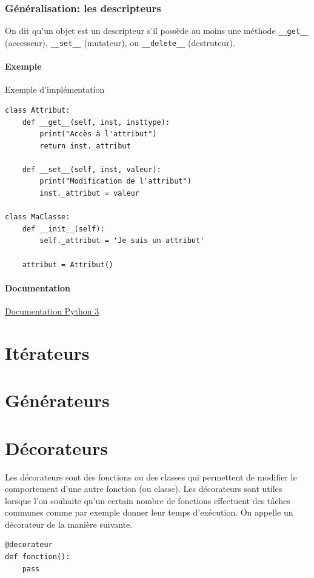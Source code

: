 \documentclass[a4paper, 10pt]{article}
\newcommand{\code}[1]{{\small\texttt{#1}}}
\begin{document}
\subsubsection{Généralisation: les descripteurs}
On dit qu'un objet est un descripteur s'il possède au moins une méthode \code{\_\_get\_\_} (accesseur), \code{\_\_set\_\_} (mutateur), ou \code{\_\_delete\_\_} (destruteur).

\paragraph{Exemple} Exemple d'implémentation
\begin{verbatim}
class Attribut:
    def __get__(self, inst, insttype):
        print("Accès à l'attribut")
        return inst._attribut

    def __set__(self, inst, valeur):
        print("Modification de l'attribut")
        inst._attribut = valeur

class MaClasse:
    def __init__(self):
        self._attribut = 'Je suis un attribut'

    attribut = Attribut()
\end{verbatim}

\paragraph{Documentation} \href{https://docs.python.org/3/howto/descriptor.html}{Documentation Python 3}

\section{Itérateurs}
\section{Générateurs}
\section{Décorateurs}
Les décorateurs sont des fonctions ou des classes qui permettent de modifier le comportement d'une autre fonction (ou classe). Les décorateurs sont utiles lorsque l'on souhaite qu'un certain nombre de fonctions effectuent des tâches communes comme par exemple donner leur temps d'exécution. On appelle un décorateur de la manière suivante.

\begin{verbatim}
@decorateur
def fonction():
    pass
\end{verbatim}
\end{document}
